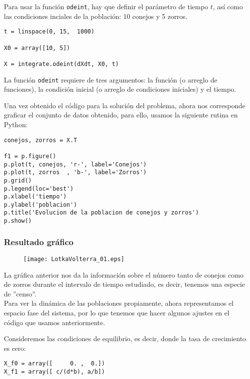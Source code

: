 \begin{frame}[fragile]
Para usar la función \texttt{odeint}, hay que definir el parámetro de tiempo $t$, así como las condiciones inciales de la población: 10 conejos y 5 zorros.
\begin{lstlisting}
t = linspace(0, 15,  1000)
              
X0 = array([10, 5])         
            
X = integrate.odeint(dXdt, X0, t)
\end{lstlisting}
La función \texttt{odeint} requiere de tres argumentos: la función (o arreglo de funciones), la condición inicial (o arreglo de condiciones iniciales) y el tiempo.
\end{frame}
\begin{frame}[fragile]
Una vez obtenido el código para la solución del problema, ahora nos corresponde graficar el conjunto de datos obtenido, para ello, usamos la siguiente rutina en Python:
\begin{lstlisting}
conejos, zorros = X.T

f1 = p.figure()
p.plot(t, conejos, 'r-', label='Conejos')
p.plot(t, zorros  , 'b-', label='Zorros')
p.grid()
p.legend(loc='best')
p.xlabel('tiempo')
p.ylabel('poblacion')
p.title('Evolucion de la poblacion de conejos y zorros')
p.show()
\end{lstlisting}
\end{frame}
\begin{frame}
\frametitle{Resultado gráfico}
\begin{figure}
	\centering
	\texttt{[image: LotkaVolterra\_01.eps]} 
\end{figure}
\end{frame}
\begin{frame}
La gráfica anterior nos da la información sobre el número tanto de conejos como de zorros durante el intervalo de tiempo estudiado, es decir, tenemos una especie de ''censo''.
\\
\medskip
Para ver la dinámica de las poblaciones propiamente, ahora representamos el espacio fase del sistema, por lo que tenemos que hacer algunos ajustes en el código que usamos anteriormente.
\end{frame}
\begin{frame}[fragile]
Consideremos las condiciones de equilibrio, es decir, donde la tasa de crecimiento es cero:
\begin{lstlisting}
X_f0 = array([     0. ,  0.])
X_f1 = array([ c/(d*b), a/b])
\end{lstlisting}
\end{frame}
